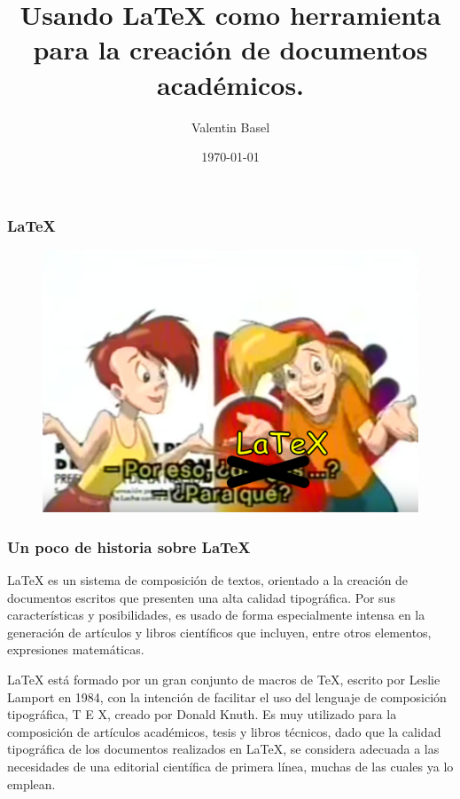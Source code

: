 \documentclass{beamer}
\title[\LaTeX{}... ¿para que?]{Usando \LaTeX{} como herramienta para la creación de documentos académicos.} %
\author{Valentin Basel} %
\institute[CIECS-UNC-CONICET] %
{
Universidad Nacional de Córdoba \\ %
\medskip
\textit{valentinbasel@gmail.com} %
}
\date{\today} %
\begin{document}
\begin{frame}
  \titlepage %
\end{frame}

\begin{frame}
\frametitle{\LaTeX{}}

  \begin{figure}
    \includegraphics[width=0.8\linewidth]{img/fleco_y_male_latex.png}
  \end{figure}
\end{frame}

\begin{frame}
  \frametitle{Un poco de historia sobre \LaTeX{}}

\LaTeX{} es un sistema de composición de textos, orientado a la creación de documentos escritos que presenten una alta calidad tipográfica. Por sus características y posibilidades, es usado de forma especialmente intensa en la generación de artículos y libros científicos que incluyen, entre otros elementos, expresiones matemáticas.

\LaTeX{} está formado por un gran conjunto de macros de TeX, escrito por Leslie Lamport en 1984, con la intención de facilitar el uso del lenguaje de composición tipográfica, T E X, creado por Donald Knuth. Es muy utilizado para la composición de artículos académicos, tesis y libros técnicos, dado que la calidad tipográfica de los documentos realizados en LaTeX, se considera adecuada a las necesidades de una editorial científica de primera línea, muchas de las cuales ya lo emplean. 

\end{frame}
\end{document}
